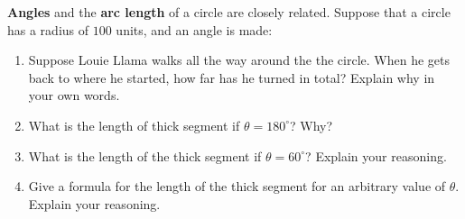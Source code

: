 \documentclass[noauthor,hints,nooutcomes,handout]{ximera}
\begin{document}
\begin{question}
\textbf{Angles} and the \textbf{arc length} of a circle are closely
related. Suppose that a circle has a radius of $100$ units, and an
angle is made:


\begin{center}
 
\end{center}
\begin{enumerate}
    \item Suppose Louie Llama walks all the way around the the
      circle. When he gets back to where he started, how far has he
      turned in total?  Explain why in your own words.
    \item What is the length of thick segment if $\theta=180^\circ$? Why?
    \item What is the length of the thick segment if $\theta=60^\circ$? Explain your reasoning.
    \item Give a formula for the length of the thick segment for an
      arbitrary value of $\theta$. Explain your reasoning.
\end{enumerate}
\end{question}
\mynewpage
\end{document}
